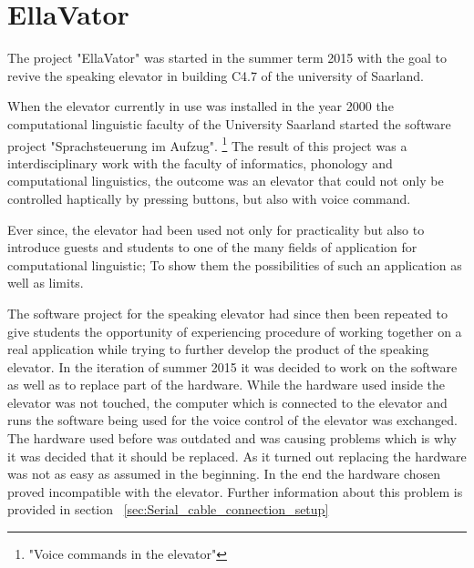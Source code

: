 \documentclass[a4paper, 12pt]{article}
\begin{document}


\pagestyle{empty}

\pagestyle{plain}
\setcounter{page}{1}
\tableofcontents
\cleardoublepage

\section{EllaVator}

The project "EllaVator" was started in the summer term 2015 with the goal to revive the speaking elevator in building C4.7 of the university of Saarland. \newline

When the elevator currently in use was installed in the year 2000 the computational linguistic faculty of the University Saarland started the software project "Sprachsteuerung im Aufzug". \footnote {"Voice commands in the elevator"}
The result of this project was a interdisciplinary work with the faculty of informatics, phonology and computational linguistics, the outcome was an elevator that could not only be controlled haptically by pressing buttons, but also with voice command. ~\cite{SprachsteuerungimAufzug} \newline

Ever since, the elevator had been used not only for practicality but also to introduce guests and students to one of the many fields of application for computational linguistic; 
To show them the possibilities of such an application as well as limits. \newline

The software project for the speaking elevator had since then been repeated to give students the opportunity of experiencing procedure of working together on a real application while trying to further develop the product of the speaking elevator.
In the iteration of summer 2015 it was decided to work on the software as well as to replace part of the hardware.
While the hardware used inside the elevator was not touched, the computer which is connected to the elevator and runs the software being used for the voice control of the elevator was exchanged.
The hardware used before was outdated and was causing problems which is why it was decided that it should be replaced. \newline
As it turned out replacing the hardware was not as easy as assumed in the beginning.
In the end the hardware chosen proved incompatible with the elevator.
Further information about this problem is provided in section ~\ref{sec:Serial_cable_connection_setup}
\newline
\end{document}
